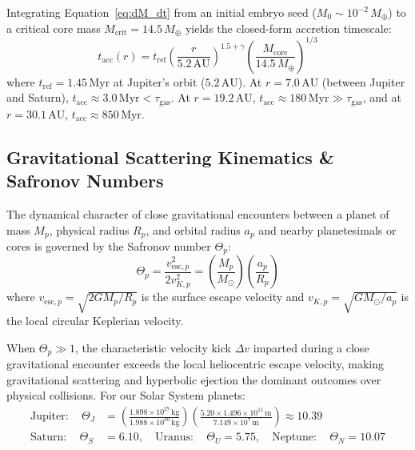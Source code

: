 \documentclass[11pt,a4paper]{article}
\begin{document}
Integrating Equation~\eqref{eq:dM_dt} from an initial embryo seed ($M_0 \sim 10^{-2}\,M_\oplus$) to a critical core mass $M_{\text{crit}} = 14.5\,M_\oplus$ yields the closed-form accretion timescale:
\begin{equation}
t_{\text{acc}}(r) = t_{\text{ref}} \left(\frac{r}{5.2\,\text{AU}}\right)^{1.5 + \gamma} \left(\frac{M_{\text{core}}}{14.5\,M_\oplus}\right)^{1/3}
\label{eq:t_acc_formula}
\end{equation}
where $t_{\text{ref}} = 1.45\,\text{Myr}$ at Jupiter's orbit ($5.2\,\text{AU}$). At $r = 7.0\,\text{AU}$ (between Jupiter and Saturn), $t_{\text{acc}} \approx 3.0\,\text{Myr} < \tau_{\text{gas}}$. At $r = 19.2\,\text{AU}$, $t_{\text{acc}} \approx 180\,\text{Myr} \gg \tau_{\text{gas}}$, and at $r = 30.1\,\text{AU}$, $t_{\text{acc}} \approx 850\,\text{Myr}$.

\subsection{Gravitational Scattering Kinematics \& Safronov Numbers}
The dynamical character of close gravitational encounters between a planet of mass $M_p$, physical radius $R_p$, and orbital radius $a_p$ and nearby planetesimals or cores is governed by the Safronov number $\Theta_p$:
\begin{equation}
\Theta_p = \frac{v_{\text{esc}, p}^2}{2 v_{K, p}^2} = \left(\frac{M_p}{M_\odot}\right) \left(\frac{a_p}{R_p}\right)
\label{eq:safronov}
\end{equation}
where $v_{\text{esc}, p} = \sqrt{2 G M_p / R_p}$ is the surface escape velocity and $v_{K, p} = \sqrt{G M_\odot / a_p}$ is the local circular Keplerian velocity.

When $\Theta_p \gg 1$, the characteristic velocity kick $\Delta v$ imparted during a close gravitational encounter exceeds the local heliocentric escape velocity, making gravitational scattering and hyperbolic ejection the dominant outcomes over physical collisions. For our Solar System planets:
\begin{align}
\text{Jupiter}: \quad \Theta_J &= \left(\frac{1.898 \times 10^{27}\,\text{kg}}{1.988 \times 10^{30}\,\text{kg}}\right) \left(\frac{5.20 \times 1.496 \times 10^{11}\,\text{m}}{7.149 \times 10^7\,\text{m}}\right) \approx 10.39 \\
\text{Saturn}: \quad \Theta_S &= 6.10, \quad \text{Uranus}: \quad \Theta_U = 5.75, \quad \text{Neptune}: \quad \Theta_N = 10.07
\end{align}
\end{document}
